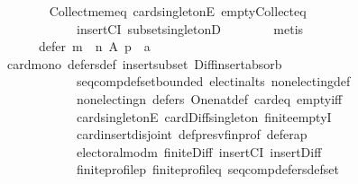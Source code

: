 \begin{isabellebody}
\ \ \ \ \ \ \isamarkupfalse%
\ Collect{\isacharunderscore}{\kern0pt}mem{\isacharunderscore}{\kern0pt}eq\ card{\isacharunderscore}{\kern0pt}{}{\isacharunderscore}{\kern0pt}singletonE\ empty{\isacharunderscore}{\kern0pt}Collect{\isacharunderscore}{\kern0pt}eq\isanewline
\ \ \ \ \ \ \ \ \ \ \ \ insertCI\ subset{\isacharunderscore}{\kern0pt}singletonD\isanewline
\ \ \ \ \ \ \isamarkupfalse%
\ metis\isanewline
\ \ \ \ \isamarkupfalse%
\ \isamarkupfalse%
\isanewline
\ \ \ \ \ \ {\isachardoublequoteopen}defer\ {\isacharparenleft}{\kern0pt}m\ {\isasymtriangleright}\ n{\isacharparenright}{\kern0pt}\ A\ p\ {\isacharequal}{\kern0pt}\ {\isacharbraceleft}{\kern0pt}a{\isacharbraceright}{\kern0pt}{\isachardoublequoteclose}\ \isanewline
\ \ \ \ \ \ \isamarkupfalse%
\ card{\isacharunderscore}{\kern0pt}mono\ defers{\isacharunderscore}{\kern0pt}def\ insert{\isacharunderscore}{\kern0pt}subset\ Diff{\isacharunderscore}{\kern0pt}insert{\isacharunderscore}{\kern0pt}absorb\isanewline
\ \ \ \ \ \ \ \ \ \ \ \ seq{\isacharunderscore}{\kern0pt}comp{\isacharunderscore}{\kern0pt}def{\isacharunderscore}{\kern0pt}set{\isacharunderscore}{\kern0pt}bounded\ elect{\isacharunderscore}{\kern0pt}in{\isacharunderscore}{\kern0pt}alts\ non{\isacharunderscore}{\kern0pt}electing{\isacharunderscore}{\kern0pt}def\isanewline
\ \ \ \ \ \ \ \ \ \ \ \ non{\isacharunderscore}{\kern0pt}electing{\isacharunderscore}{\kern0pt}n\ defers{\isacharunderscore}{\kern0pt}{}\ One{\isacharunderscore}{\kern0pt}nat{\isacharunderscore}{\kern0pt}def\ card{\isacharunderscore}{\kern0pt}{}{\isacharunderscore}{\kern0pt}eq\ empty{\isacharunderscore}{\kern0pt}iff\isanewline
\ \ \ \ \ \ \ \ \ \ \ \ card{\isacharunderscore}{\kern0pt}{}{\isacharunderscore}{\kern0pt}singletonE\ card{\isacharunderscore}{\kern0pt}Diff{\isacharunderscore}{\kern0pt}singleton\ finite{\isachardot}{\kern0pt}emptyI\isanewline
\ \ \ \ \ \ \ \ \ \ \ \ card{\isacharunderscore}{\kern0pt}insert{\isacharunderscore}{\kern0pt}disjoint\ def{\isacharunderscore}{\kern0pt}presv{\isacharunderscore}{\kern0pt}fin{\isacharunderscore}{\kern0pt}prof\ defer{\isacharunderscore}{\kern0pt}a{\isacharunderscore}{\kern0pt}p\isanewline
\ \ \ \ \ \ \ \ \ \ \ \ electoral{\isacharunderscore}{\kern0pt}mod{\isacharunderscore}{\kern0pt}m\ finite{\isacharunderscore}{\kern0pt}Diff\ insertCI\ insert{\isacharunderscore}{\kern0pt}Diff\isanewline
\ \ \ \ \ \ \ \ \ \ \ \ finite{\isacharunderscore}{\kern0pt}profile{\isacharunderscore}{\kern0pt}p\ finite{\isacharunderscore}{\kern0pt}profile{\isacharunderscore}{\kern0pt}q\ seq{\isacharunderscore}{\kern0pt}comp{\isacharunderscore}{\kern0pt}defers{\isacharunderscore}{\kern0pt}def{\isacharunderscore}{\kern0pt}set\isanewline

\end{isabellebody}
